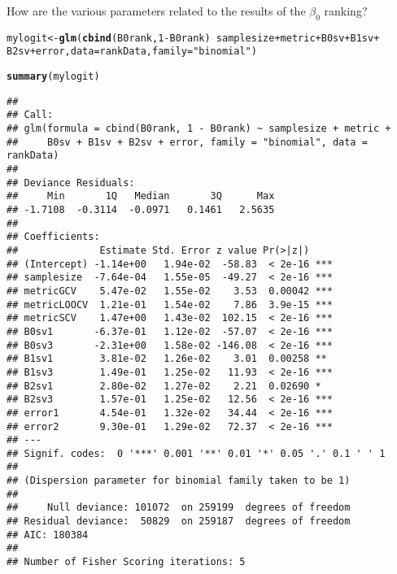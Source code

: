 \documentclass{article}\usepackage[]{graphicx}\usepackage[]{color}
\makeatletter
\newcommand{\hlnum}[1]{\textcolor[rgb]{0.686,0.059,0.569}{#1}}%
\newcommand{\hlstr}[1]{\textcolor[rgb]{0.192,0.494,0.8}{#1}}%
\newcommand{\hlopt}[1]{\textcolor[rgb]{0,0,0}{#1}}%
\newcommand{\hlstd}[1]{\textcolor[rgb]{0.345,0.345,0.345}{#1}}%
\newcommand{\hlkwb}[1]{\textcolor[rgb]{0.69,0.353,0.396}{#1}}%
\newcommand{\hlkwc}[1]{\textcolor[rgb]{0.333,0.667,0.333}{#1}}%
\newcommand{\hlkwd}[1]{\textcolor[rgb]{0.737,0.353,0.396}{\textbf{#1}}}%
\newenvironment{kframe}{%
 \def\at@end@of@kframe{}%
 \ifinner\ifhmode%
  \def\at@end@of@kframe{\end{minipage}}%
  \begin{minipage}{\columnwidth}%
 \fi\fi%
 \def\FrameCommand##1{\hskip\@totalleftmargin \hskip-\fboxsep
 \colorbox{shadecolor}{##1}\hskip-\fboxsep
     \hskip-\linewidth \hskip-\@totalleftmargin \hskip\columnwidth}%
 \MakeFramed {\advance\hsize-\width
   \@totalleftmargin\z@ \linewidth\hsize
   \@setminipage}}%
 {\par\unskip\endMakeFramed%
 \at@end@of@kframe}
\newenvironment{knitrout}{}{} %
\makeatother
\begin{document}
How are the various parameters related to the results of the $\beta _0$ ranking?
\begin{knitrout}
\color{fgcolor}\begin{kframe}
\begin{alltt}
\hlstd{mylogit} \hlkwb{<-} \hlkwd{glm}\hlstd{(}\hlkwd{cbind}\hlstd{(B0rank,} \hlnum{1} \hlopt{-} \hlstd{B0rank)} \hlopt{~} \hlstd{samplesize} \hlopt{+} \hlstd{metric} \hlopt{+} \hlstd{B0sv} \hlopt{+} \hlstd{B1sv} \hlopt{+}
    \hlstd{B2sv} \hlopt{+} \hlstd{error,} \hlkwc{data} \hlstd{= rankData,} \hlkwc{family} \hlstd{=} \hlstr{"binomial"}\hlstd{)}
\end{alltt}


{\ttfamily\noindent\color{warningcolor}{\#\# Warning: non-integer counts in a binomial glm!}}\begin{alltt}
\hlkwd{summary}\hlstd{(mylogit)}
\end{alltt}
\begin{verbatim}
## 
## Call:
## glm(formula = cbind(B0rank, 1 - B0rank) ~ samplesize + metric + 
##     B0sv + B1sv + B2sv + error, family = "binomial", data = rankData)
## 
## Deviance Residuals: 
##     Min       1Q   Median       3Q      Max  
## -1.7108  -0.3114  -0.0971   0.1461   2.5635  
## 
## Coefficients:
##              Estimate Std. Error z value Pr(>|z|)    
## (Intercept) -1.14e+00   1.94e-02  -58.83  < 2e-16 ***
## samplesize  -7.64e-04   1.55e-05  -49.27  < 2e-16 ***
## metricGCV    5.47e-02   1.55e-02    3.53  0.00042 ***
## metricLOOCV  1.21e-01   1.54e-02    7.86  3.9e-15 ***
## metricSCV    1.47e+00   1.43e-02  102.15  < 2e-16 ***
## B0sv1       -6.37e-01   1.12e-02  -57.07  < 2e-16 ***
## B0sv3       -2.31e+00   1.58e-02 -146.08  < 2e-16 ***
## B1sv1        3.81e-02   1.26e-02    3.01  0.00258 ** 
## B1sv3        1.49e-01   1.25e-02   11.93  < 2e-16 ***
## B2sv1        2.80e-02   1.27e-02    2.21  0.02690 *  
## B2sv3        1.57e-01   1.25e-02   12.56  < 2e-16 ***
## error1       4.54e-01   1.32e-02   34.44  < 2e-16 ***
## error2       9.30e-01   1.29e-02   72.37  < 2e-16 ***
## ---
## Signif. codes:  0 '***' 0.001 '**' 0.01 '*' 0.05 '.' 0.1 ' ' 1
## 
## (Dispersion parameter for binomial family taken to be 1)
## 
##     Null deviance: 101072  on 259199  degrees of freedom
## Residual deviance:  50829  on 259187  degrees of freedom
## AIC: 180384
## 
## Number of Fisher Scoring iterations: 5
\end{verbatim}
\end{kframe}
\end{knitrout}
\end{document}
